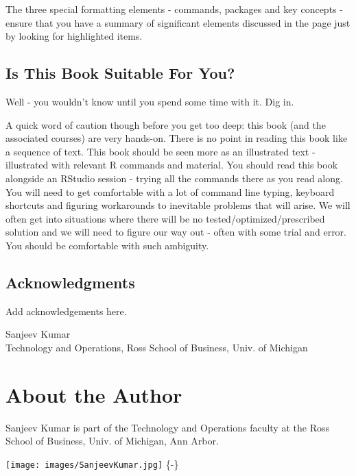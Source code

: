 \documentclass[
]{krantz}
\begin{document}
The three special formatting elements - commands, packages and key concepts - ensure that you have a summary of significant elements discussed in the page just by looking for highlighted items.

\hypertarget{is-this-book-suitable-for-you}{%
\section*{Is This Book Suitable For You?}\label{is-this-book-suitable-for-you}}


Well - you wouldn't know until you spend some time with it. Dig in.

A quick word of caution though before you get too deep: this book (and the associated courses) are very hands-on. There is no point in reading this book like a sequence of text. This book should be seen more as an illustrated text - illustrated with relevant R commands and material. You should read this book alongside an RStudio session - trying all the commands there as you read along. You will need to get comfortable with a lot of command line typing, keyboard shortcuts and figuring workarounds to inevitable problems that will arise. We will often get into situations where there will be no tested/optimized/prescribed solution and we will need to figure our way out - often with some trial and error. You should be comfortable with such ambiguity.

\hypertarget{acknowledgments}{%
\section*{Acknowledgments}\label{acknowledgments}}


Add acknowledgements here.

\begin{flushright}
Sanjeev Kumar\\
Technology and Operations, Ross School of Business, Univ. of Michigan
\end{flushright}

\hypertarget{about-the-author}{%
\chapter*{About the Author}\label{about-the-author}}


Sanjeev Kumar is part of the Technology and Operations faculty at the Ross School of Business, Univ. of Michigan, Ann Arbor.

\texttt{[image: images/SanjeevKumar.jpg]} \{-\}
\end{document}
